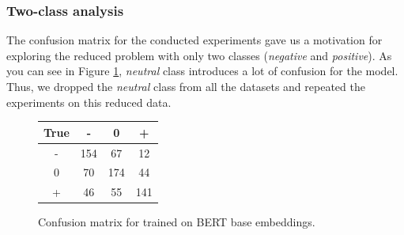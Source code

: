 \subsubsection{Two-class analysis}
The confusion matrix for the conducted experiments gave us a motivation for exploring the reduced problem with only two classes ({\it negative} and {\it positive}). As you can see in Figure \ref{confusion}, {\it neutral} class introduces a lot of confusion for the model. Thus, we dropped the {\it neutral} class from all the datasets and repeated the experiments on this reduced data.
\begin{figure}
\begin{center}
 \begin{tabular}{|c || c | c | c|} 
 \hline
 True & - & 0 & + \\
 \hline
 - & 154 & 67 & 12 \\
 0 & 70 & 174 & 44 \\
 + & 46 & 55 & 141 \\
 \hline
\end{tabular}
\end{center}
\caption{Confusion matrix for \taskORG trained on BERT base embeddings.}
\label{confusion}
\end{figure}